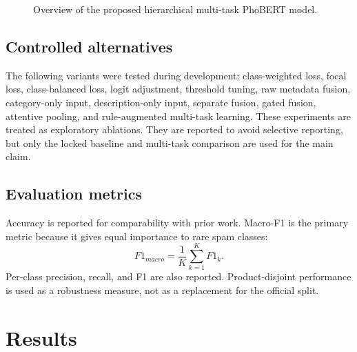 \documentclass[runningheads]{llncs}
\begin{document}
\begin{figure}[t]
{
}%
\caption{Overview of the proposed hierarchical multi-task PhoBERT model.}
\label{fig:architecture}
\end{figure}

\subsection{Controlled alternatives}
The following variants were tested during development: class-weighted loss, focal loss, class-balanced loss, logit adjustment, threshold tuning, raw metadata fusion, category-only input, description-only input, separate fusion, gated fusion, attentive pooling, and rule-augmented multi-task learning. These experiments are treated as exploratory ablations. They are reported to avoid selective reporting, but only the locked baseline and multi-task comparison are used for the main claim.

\subsection{Evaluation metrics}
Accuracy is reported for comparability with prior work. Macro-F1 is the primary metric because it gives equal importance to rare spam classes:
\begin{equation}
F1_{macro}=\frac{1}{K}\sum_{k=1}^{K}F1_k.
\end{equation}
Per-class precision, recall, and F1 are also reported. Product-disjoint performance is used as a robustness measure, not as a replacement for the official split.

\section{Results}
\end{document}
